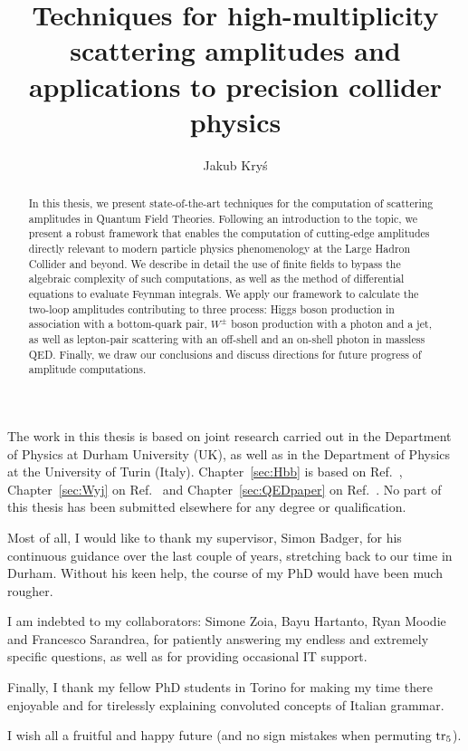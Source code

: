 \documentclass[twoside,frontopenright,halfspacing, openany]{ip3thesis}
\begin{document}
\title{Techniques for high-multiplicity scattering amplitudes and applications to precision collider physics}
\author{Jakub Kry\'s}
\maketitlepage*

\begin{abstract}
%
	In this thesis, we present state-of-the-art techniques for the computation of scattering amplitudes in Quantum Field Theories. Following an introduction to the topic, we present a robust framework that enables the computation of cutting-edge amplitudes directly relevant to modern particle physics phenomenology at the Large Hadron Collider and beyond. We describe in detail the use of finite fields to bypass the algebraic complexity of such computations, as well as the method of differential equations to evaluate Feynman integrals. We apply our framework to calculate the two-loop amplitudes contributing to three process: Higgs boson production in association with a bottom-quark pair, $W^\pm$ boson production with a photon and a jet, as well as lepton-pair scattering with an off-shell and an on-shell photon in massless QED. Finally, we draw our conclusions and discuss directions for future progress of amplitude computations.
%
\end{abstract}

\disableprotrusion
\tableofcontents*
\enableprotrusion

\begin{declaration*}
%
	The work in this thesis is based on joint research carried out in the Department of Physics at Durham University (UK), as well as in the Department of Physics at the University of Turin (Italy). Chapter~\ref{sec:Hbb} is based on Ref.~\cite{Badger:2021ega}, Chapter~\ref{sec:Wyj} on Ref.~\cite{Badger:2022ncb} and Chapter~\ref{sec:QEDpaper} on Ref.~\cite{Badger:2023xtl}. No part of this thesis has been submitted elsewhere for any degree or qualification.  
%
\end{declaration*}

\begin{acknowledgements*}
%
	Most of all, I would like to thank my supervisor, Simon Badger, for his continuous guidance over the last couple of years, stretching back to our time in Durham. Without his keen help, the course of my PhD would have been much rougher.
 
    I am indebted to my collaborators: Simone Zoia, Bayu Hartanto, Ryan Moodie and Francesco Sarandrea, for patiently answering my endless and extremely specific questions, as well as for providing occasional IT support.
    
    Finally, I thank my fellow PhD students in Torino for making my time there enjoyable and for tirelessly explaining convoluted concepts of Italian grammar.
    
    I wish all a fruitful and happy future (and no sign mistakes when permuting $\operatorname{\rm tr}_5$).
%
\end{acknowledgements*}
\end{document}
